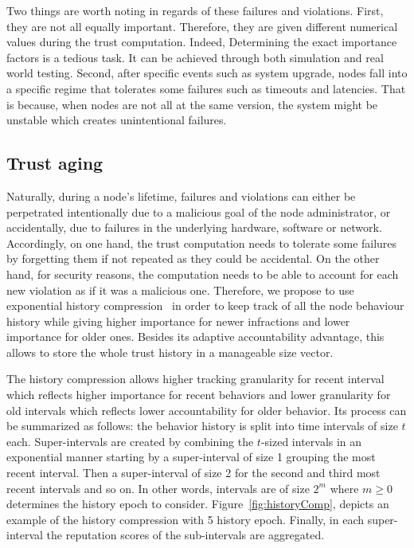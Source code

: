 \documentclass[]{article}
\begin{document}
Two things are worth noting in regards of these failures and violations. First, they are not all equally important. Therefore, they are given different numerical values during the trust computation. Indeed, Determining the exact importance factors is a tedious task. It can be achieved through both simulation and real world testing. Second, after specific events such as system upgrade, nodes fall into a specific regime that tolerates some failures such as timeouts and latencies. That is because, when nodes are not all at the same version, the system might be unstable which creates unintentional failures.  

\subsection{Trust aging}
Naturally, during a node's lifetime, failures and violations can either be perpetrated intentionally due to a malicious goal of the node administrator, or accidentally, due to failures in the underlying hardware, software or network. Accordingly, on one hand, the trust computation needs to tolerate some failures by forgetting them if not repeated as they could be accidental. On the other hand, for security reasons, the computation needs to be able to account for each new violation as if it was a malicious one. Therefore, we propose to use exponential history compression~\cite{srivatsa2005trustguard} in order to keep track of all the node behaviour history while giving higher importance for newer infractions and lower importance for older ones. Besides its adaptive accountability advantage, this allows to store the whole trust history in a manageable size vector.   

The history compression allows higher tracking granularity for recent interval which reflects higher importance for recent behaviors and lower granularity for old intervals which reflects lower accountability for older behavior. Its process can be summarized as follows: the behavior history is split into time intervals of size $t$ each. Super-intervals are created by combining the $t$-sized intervals in an exponential manner starting by a super-interval of size 1 grouping the most recent interval. Then a super-interval of size 2 for the second and third most recent intervals and so on. In other words, intervals are of size $2^m$ where $m \geq 0$ determines the history epoch to consider. Figure~\ref{fig:historyComp}, depicts an example of the history compression with 5 history epoch. Finally, in each super-interval the reputation scores of the sub-intervals are aggregated.
\end{document}
